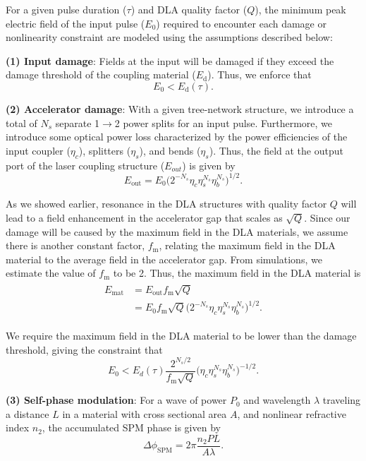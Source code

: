 For a given pulse duration ($\tau$) and DLA quality factor ($Q$), the minimum peak electric field of the input pulse ($E_0$) required to encounter each damage or nonlinearity constraint are modeled using the assumptions described below:

\textbf{(1) Input damage}: Fields at the input will be damaged if they exceed the damage threshold of the coupling material ($E_\textrm{d}$). Thus, we enforce that
\begin{equation}
E_0 < E_\textrm{d}(\tau).
\end{equation}

\textbf{(2) Accelerator damage}: With a given tree-network structure, we introduce a total of $N_s$ separate 1$\to$2 power splits for an input pulse. Furthermore, we introduce some optical power loss characterized by the power efficiencies of the input coupler ($\eta_{c}$), splitters ($\eta_s$), and bends ($\eta_s$). Thus, the field at the output port of the laser coupling structure ($E_{out}$) is given by
\begin{equation}
E_{\textrm{out}} = E_0 \Big( 2^{-N_s} \eta_c \eta_s^{N_s} \eta_b^{N_s} \Big)^{1/2}.
\end{equation}

As we showed earlier, resonance in the DLA structures with quality factor $Q$ will lead to a field enhancement in the accelerator gap that scales as $\sqrt{Q}$. Since our damage will be caused by the maximum field in the DLA materials, we assume there is another constant factor, $f_\textrm{m}$, relating the maximum field in the DLA material to the average field in the accelerator gap. From simulations, we estimate the value of $f_\textrm{m}$ to be 2. Thus, the maximum field in the DLA material is
\begin{align}
\begin{split}
E_{\textrm{mat}} &= E_\textrm{out} f_\textrm{m} \sqrt{Q} \\
 &= E_0 f_\textrm{m} \sqrt{Q} \Big( 2^{-N_s} \eta_c \eta_s^{N_s} \eta_b^{N_s} \Big)^{1/2}.
 \end{split}
\end{align}

We require the maximum field in the DLA material to be lower than the damage threshold, giving the constraint that
\begin{equation}
E_0 < E_d(\tau) \frac{2^{N_s/2}}{f_\textrm{m} \sqrt{Q}} \Big( \eta_c \eta_s^{N_s} \eta_b^{N_s} \Big)^{-1/2}.
\end{equation}

\textbf{(3) Self-phase modulation}: For a wave of power $P_0$ and wavelength $\lambda$ traveling a distance $L$ in a material with cross sectional area $A$, and nonlinear refractive index $n_2$, the accumulated SPM phase is given by \cite{teich1991fundamentals}
\begin{equation}
\Delta\phi_\textrm{SPM} = 2\pi \frac{n_2 PL}{A\lambda}.
\end{equation}

